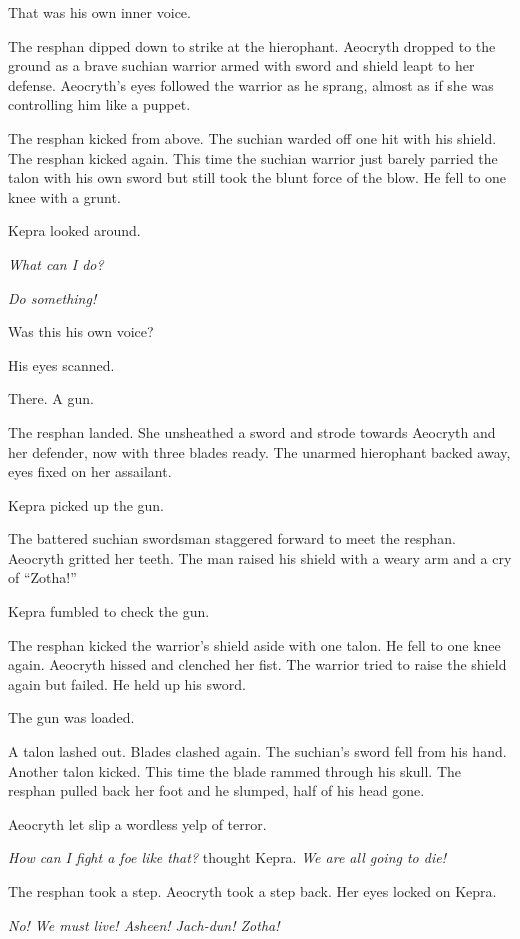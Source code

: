 \documentclass
  [a4paper,
   12pt,
   oneside
  ]%
  {article}
\begin{document}
That was his own inner voice.

The resphan dipped down to strike at the hierophant. 
Aeocryth dropped to the ground as a brave suchian warrior armed with sword and shield leapt to her defense. 
Aeocryth's eyes followed the warrior as he sprang, almost as if she was controlling him like a puppet.

The resphan kicked from above. 
The suchian warded off one hit with his shield. 
The resphan kicked again. 
This time the suchian warrior just barely parried the talon with his own sword but still took the blunt force of the blow. 
He fell to one knee with a grunt. 

Kepra looked around. 

\emph{What can I do?}

\emph{Do something!}

Was this his own voice?

His eyes scanned.

There. A gun. 

The resphan landed. She unsheathed a sword and strode towards Aeocryth and her defender, now with three blades ready. The unarmed hierophant backed away, eyes fixed on her assailant. 

Kepra picked up the gun. 

The battered suchian swordsman staggered forward to meet the resphan. Aeocryth gritted her teeth. The man raised his shield with a weary arm and a cry of ``Zotha!''

Kepra fumbled to check the gun. 

The resphan kicked the warrior's shield aside with one talon. 
He fell to one knee again. 
Aeocryth hissed and clenched her fist.
The warrior tried to raise the shield again but failed. 
He held up his sword. 

The gun was loaded.

A talon lashed out. Blades clashed again. The suchian’s sword fell from his hand. Another talon kicked. This time the blade rammed through his skull. 
The resphan pulled back her foot and he slumped, half of his head gone.

Aeocryth let slip a wordless yelp of terror.

\emph{How can I fight a foe like that?} thought Kepra. \emph{We are all going to die!}

The resphan took a step. Aeocryth took a step back. Her eyes locked on Kepra.

\emph{No! We must live! Asheen! Jach-dun! Zotha!}
\end{document}
